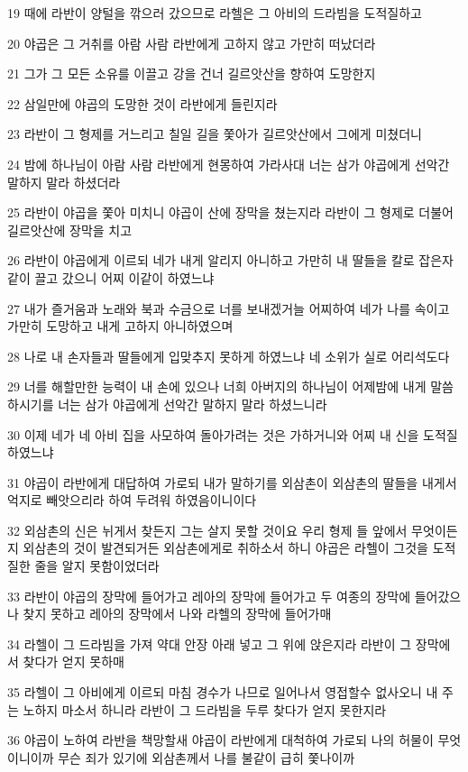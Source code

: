 \par 19 때에 라반이 양털을 깎으러 갔으므로 라헬은 그 아비의 드라빔을 도적질하고
\par 20 야곱은 그 거취를 아람 사람 라반에게 고하지 않고 가만히 떠났더라
\par 21 그가 그 모든 소유를 이끌고 강을 건너 길르앗산을 향하여 도망한지
\par 22 삼일만에 야곱의 도망한 것이 라반에게 들린지라
\par 23 라반이 그 형제를 거느리고 칠일 길을 쫓아가 길르앗산에서 그에게 미쳤더니
\par 24 밤에 하나님이 아람 사람 라반에게 현몽하여 가라사대 너는 삼가 야곱에게 선악간 말하지 말라 하셨더라
\par 25 라반이 야곱을 쫓아 미치니 야곱이 산에 장막을 쳤는지라 라반이 그 형제로 더불어 길르앗산에 장막을 치고
\par 26 라반이 야곱에게 이르되 네가 내게 알리지 아니하고 가만히 내 딸들을 칼로 잡은자 같이 끌고 갔으니 어찌 이같이 하였느냐
\par 27 내가 즐거움과 노래와 북과 수금으로 너를 보내겠거늘 어찌하여 네가 나를 속이고 가만히 도망하고 내게 고하지 아니하였으며
\par 28 나로 내 손자들과 딸들에게 입맞추지 못하게 하였느냐 네 소위가 실로 어리석도다
\par 29 너를 해할만한 능력이 내 손에 있으나 너희 아버지의 하나님이 어제밤에 내게 말씀하시기를 너는 삼가 야곱에게 선악간 말하지 말라 하셨느니라
\par 30 이제 네가 네 아비 집을 사모하여 돌아가려는 것은 가하거니와 어찌 내 신을 도적질하였느냐
\par 31 야곱이 라반에게 대답하여 가로되 내가 말하기를 외삼촌이 외삼촌의 딸들을 내게서 억지로 빼앗으리라 하여 두려워 하였음이니이다
\par 32 외삼촌의 신은 뉘게서 찾든지 그는 살지 못할 것이요 우리 형제 들 앞에서 무엇이든지 외삼촌의 것이 발견되거든 외삼촌에게로 취하소서 하니 야곱은 라헬이 그것을 도적질한 줄을 알지 못함이었더라
\par 33 라반이 야곱의 장막에 들어가고 레아의 장막에 들어가고 두 여종의 장막에 들어갔으나 찾지 못하고 레아의 장막에서 나와 라헬의 장막에 들어가매
\par 34 라헬이 그 드라빔을 가져 약대 안장 아래 넣고 그 위에 앉은지라 라반이 그 장막에서 찾다가 얻지 못하매
\par 35 라헬이 그 아비에게 이르되 마침 경수가 나므로 일어나서 영접할수 없사오니 내 주는 노하지 마소서 하니라 라반이 그 드라빔을 두루 찾다가 얻지 못한지라
\par 36 야곱이 노하여 라반을 책망할새 야곱이 라반에게 대척하여 가로되 나의 허물이 무엇이니이까 무슨 죄가 있기에 외삼촌께서 나를 불같이 급히 쫓나이까
